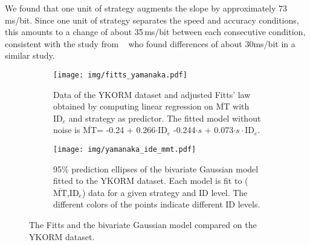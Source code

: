\documentclass[acmlarge, manuscript,review]{acmart}
\newcommand{\mmt}{\ensuremath{\overline{\mt}}\xspace}
\newcommand{\mt}{\ensuremath{{\text{MT}}}\xspace}
\newcommand{\ide}{\ensuremath{{\text{ID}_e}}\xspace}
\begin{document}


We found that one unit of strategy augments the slope by approximately 73 ms/bit. Since one unit of strategy separates the speed and accuracy conditions, this amounts to a change of about 35\,ms/bit between each consecutive condition, consistent with the study from \citeauthor{zhai2004nominal}~\cite{zhai2004nominal} who found differences of about 30ms/bit in a similar study.


\begin{figure}[htbp]
   \centering
   \begin{subfigure}[t]{0.43\textwidth}
	  \texttt{[image: img/fitts\_yamanaka.pdf]}
	\caption{Data of the YKORM dataset and adjusted Fitts' law obtained by computing linear regression on \mmt with \ide and strategy as predictor. The fitted model without noise is \mmt = -0.24 + 0.266$\cdot{}\ide$ -0.244$\cdot{}s$ + 0.073$\cdot{}s\cdot{}\ide$.}
	\label{fig:fitts_yamanaka}
   \end{subfigure}
   \hfill
   \begin{subfigure}[t]{0.55\textwidth}
	   \texttt{[image: img/yamanaka\_ide\_mmt.pdf]}
	\caption{95\% prediction ellipses of the bivariate Gaussian model fitted to the YKORM dataset. Each model is fit to (\mmt,\ide) data for a given strategy and ID level. The different colors of the points indicate different ID levels.}
	\label{fig:yamanaka_ide_mmt}
   \end{subfigure}
\caption{The Fitts and the bivariate Gaussian model compared on the YKORM dataset.}
\label{fig:main}
\end{figure}

\end{document}
